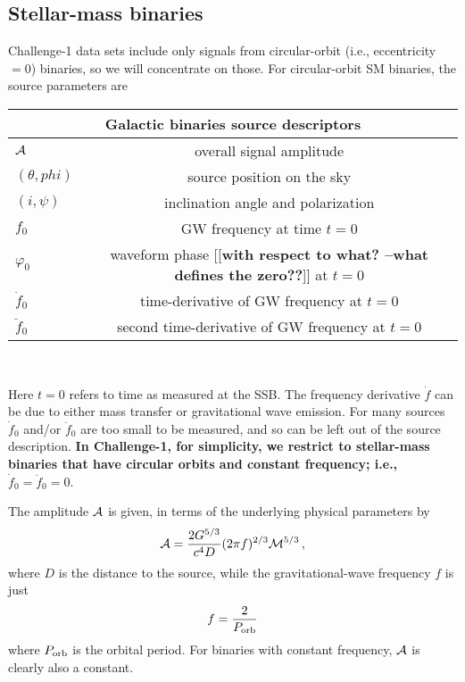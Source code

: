 \documentclass[11pt]{report}
\begin{document}
\subsection{Stellar-mass binaries}
Challenge-1 data sets include only signals from circular-orbit (i.e., eccentricity $= 0$) binaries, so we will concentrate on those. 
For circular-orbit SM binaries, the source parameters are

\begin{center}
\begin{tabular}{l|c}
\hline \hline
\multicolumn{2}{c}{{\bf Galactic binaries source descriptors}} \\
\hline
\hline
${\cal A}$ & overall signal amplitude\\
$(\theta, phi)$ & source position on the sky\\
$(i,\psi)$ & inclination angle and polarization\\
$f_0$    & GW frequency at time $t=0$ \\ 
$\varphi_0$ &  waveform phase [[{\bf with respect to what? --what defines the zero??}]] at $t=0$\\
$\dot{f}_0$ & time-derivative of GW frequency at $t=0$\\
$\ddot{f}_0$ & second time-derivative of GW frequency at $t=0$ \\
\hline \hline
\end{tabular} \\
\end{center}

Here $t=0$ refers to time as measured at the SSB. 
The frequency derivative $\dot{f}$ can be due to either mass transfer or gravitational wave emission.
For many sources 
$\dot{f}_0$ and/or $\ddot{f}_0$ are too small to be measured, and so can 
be left out of the source description. 
{\bf In Challenge-1, for simplicity, we restrict to stellar-mass binaries that have circular orbits and constant frequency; i.e., $\dot f_0 = \ddot f_0 =0$}.

The amplitude ${\cal A}$ is given, in terms of the underlying physical parameters by
\begin{equation}\label{amp}
{\cal A} = {{2G^{5/3}}\over{c^4 D}}(2\pi f)^{2/3} {\cal M}^{5/3} \, , 
\end{equation}
where $D$ is the distance to the source, while the gravitational-wave frequency $f$ is just
\begin{equation}\label{freq}
f  = {{2}\over{P_{\rm orb}}}
\end{equation}
where $P_{\rm orb}$ is the orbital period.
For binaries with constant frequency, ${\cal A}$ is clearly also a constant.
\end{document}
